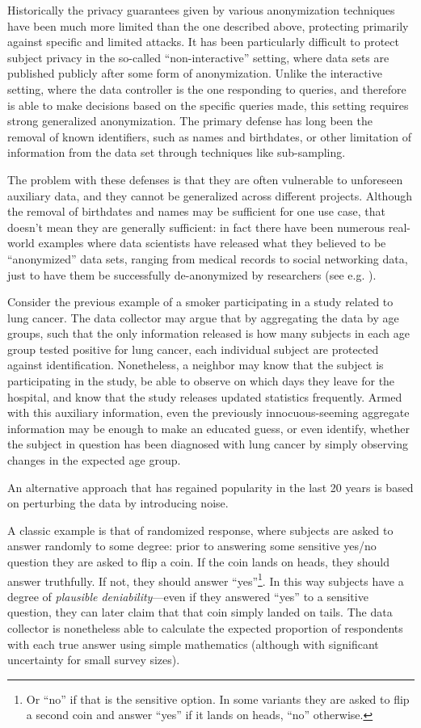 \documentclass[12pt]{article}
\begin{document}
Historically the privacy guarantees given by various anonymization techniques have been much more limited than the one described above, protecting primarily against specific and limited attacks. It has been particularly difficult to protect subject privacy in the so-called ``non-interactive'' setting, where data sets are published publicly after some form of anonymization. Unlike the interactive setting, where the data controller is the one responding to queries, and therefore is able to make decisions based on the specific queries made, this setting requires strong generalized anonymization. The primary defense has long been the removal of known identifiers, such as names and birthdates, or other limitation of information from the data set through techniques like sub-sampling.

The problem with these defenses is that they are often vulnerable to unforeseen auxiliary data, and they cannot be generalized across different projects. Although the removal of birthdates and names may be sufficient for one use case, that doesn't mean they are generally sufficient: in fact there have been numerous real-world examples where data scientists have released what they believed to be ``anonymized'' data sets, ranging from medical records to social networking data, just to have them be successfully de-anonymized by researchers (see e.g. \cite{reidentification2011}).

Consider the previous example of a smoker participating in a study related to lung cancer. The data collector may argue that by aggregating the data by age groups, such that the only information released is how many subjects in each age group tested positive for lung cancer, each individual subject are protected against identification. Nonetheless, a neighbor may know that the subject is participating in the study, be able to observe on which days they leave for the hospital, and know that the study releases updated statistics frequently. Armed with this auxiliary information, even the previously innocuous-seeming aggregate information may be enough to make an educated guess, or even identify, whether the subject in question has been diagnosed with lung cancer by simply observing changes in the expected age group. \bigskip

An alternative approach that has regained popularity in the last 20 years is based on perturbing the data by introducing noise.

A classic example is that of randomized response, where subjects are asked to answer randomly to some degree: prior to answering some sensitive yes/no question they are asked to flip a coin. If the coin lands on heads, they should answer truthfully. If not, they should answer ``yes''\footnote{Or ``no'' if that is the sensitive option. In some variants they are asked to flip a second coin and answer ``yes'' if it lands on heads, ``no'' otherwise.}. In this way subjects have a degree of \emph{plausible deniability}---even if they answered ``yes'' to a sensitive question, they can later claim that that coin simply landed on tails. The data collector is nonetheless able to calculate the expected proportion of respondents with each true answer using simple mathematics (although with significant uncertainty for small survey sizes).
\end{document}
